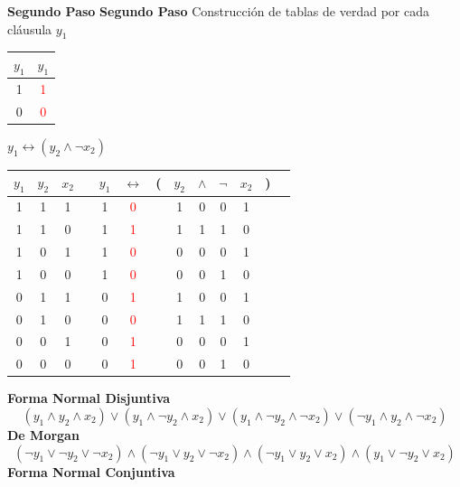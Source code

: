 \documentclass[a4paper]{article}
\begin{document}
\textbf{Segundo Paso}
\textbf{Segundo Paso}
\newline 
Construcción de tablas de verdad por cada cláusula
\newline 
\(y_1\)
\newline 
\begin{tabular}{@{ }c | c}
    \(y_{1}\) & \(y_{1}\)\\
    \hline 
    1 & \textcolor{red}{1}\\
    0 & \textcolor{red}{0}\\
\end{tabular}
\newline
\(y_{1} \longleftrightarrow \left(y_{2} \land \neg x_{2}\right)\)
\newline
\begin{tabular}{@{ }c@{ }@{ }c@{ }@{ }c | c@{ }@{ }c@{ }@{ }c@{ }@{}c@{}@{ }c@{ }@{ }c@{ }@{ }c@{ }@{ }c@{ }@{}c@{}@{ }c}
    \(y_{1}\) & \(y_{2}\) & \(x_{2}\) &  & \(y_{1}\) & $\leftrightarrow$ & ( & \(y_{2}\) & $\land$ & $\lnot$ & \(x_{2}\) & ) & \\
    \hline 
    1 & 1 & 1 &  & 1 & \textcolor{red}{0} &  & 1 & 0 & 0 & 1 &  & \\
    1 & 1 & 0 &  & 1 & \textcolor{red}{1} &  & 1 & 1 & 1 & 0 &  & \\
    1 & 0 & 1 &  & 1 & \textcolor{red}{0} &  & 0 & 0 & 0 & 1 &  & \\
    1 & 0 & 0 &  & 1 & \textcolor{red}{0} &  & 0 & 0 & 1 & 0 &  & \\
    0 & 1 & 1 &  & 0 & \textcolor{red}{1} &  & 1 & 0 & 0 & 1 &  & \\
    0 & 1 & 0 &  & 0 & \textcolor{red}{0} &  & 1 & 1 & 1 & 0 &  & \\
    0 & 0 & 1 &  & 0 & \textcolor{red}{1} &  & 0 & 0 & 0 & 1 &  & \\
    0 & 0 & 0 &  & 0 & \textcolor{red}{1} &  & 0 & 0 & 1 & 0 &  & \\
\end{tabular}
\newline
\textbf{Forma Normal Disjuntiva}
\[
    \left(y_{1} \land y_{2} \land x_{2}\right) \lor \left(y_{1} \land \neg y_{2} \land x_{2}\right) \lor 
    \left(y_{1} \land \neg y_{2} \land \neg x_{2}\right) \lor \left(\neg y_{1} \land y_{2} \land \neg x_{2}\right)
\]
\textbf{De Morgan}
\[
    \left(\neg y_{1} \lor \neg y_{2} \lor \neg x_{2}\right) \land \left( \neg y_{1} \lor y_{2} \lor \neg x_{2}\right) \land
    \left(\neg y_{1} \lor y_{2} \lor x_{2}\right) \land \left( y_{1} \lor \neg y_{2} \lor x_{2}\right)
\]
\textbf{Forma Normal Conjuntiva}
\end{document}

